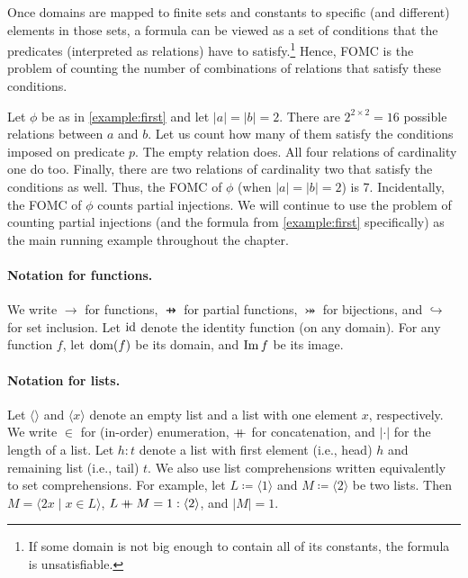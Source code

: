 Once domains are mapped to finite sets and constants to specific (and different)
elements in those sets, a formula can be viewed as a set of conditions that the
predicates (interpreted as relations) have to satisfy.\footnote{If some domain
  is not big enough to contain all of its constants, the formula is
  unsatisfiable.} Hence, FOMC is the problem of counting the number of
combinations of relations that satisfy these conditions.

\begin{example}
  Let $\phi$ be as in \cref{example:first} and let $|a| = |b| = 2$. There are
  $2^{2 \times 2} = 16$ possible relations between $a$ and $b$. Let us count how
  many of them satisfy the conditions imposed on predicate $p$. The empty
  relation does. All four relations of cardinality one do too. Finally, there
  are two relations of cardinality two that satisfy the conditions as well.
  Thus, the FOMC of $\phi$ (when $|a| = |b| = 2$) is 7. Incidentally, the FOMC
  of $\phi$ counts partial injections. We will continue to use the problem of
  counting partial injections (and the formula from \cref{example:first}
  specifically) as the main running example throughout the chapter.
\end{example}

\paragraph*{Notation for functions.}
We write $\to$ for functions, $\pfun$ for partial functions,
$\twoheadrightarrowtail$ for bijections, and $\hookrightarrow$ for set
inclusion. Let $\operatorname{id}$ denote the identity function (on any domain). For any
function $f$, let $\operatorname{dom}(f)$ be its domain, and $\operatorname{Im} f$ be its image.

\paragraph*{Notation for lists.}
Let $\langle\rangle$ and $\langle x \rangle$ denote an empty list and a list
with one element $x$, respectively. We write $\in$ for (in-order) enumeration,
$\mathbin{+\mkern-10mu+}$ for concatenation, and $|\cdot|$ for the length of a list. Let
$h : t$ denote a list with first element (i.e., head) $h$ and remaining list
(i.e., tail) $t$. We also use list comprehensions written equivalently to set
comprehensions. For example, let $L \coloneqq \langle 1 \rangle$ and
$M \coloneqq \langle 2 \rangle$ be two lists. Then
$M = \langle 2x \mid x \in L \rangle$,
$L \mathbin{+\mkern-10mu+} M = 1 : \langle 2 \rangle$, and $|M| = 1$.


